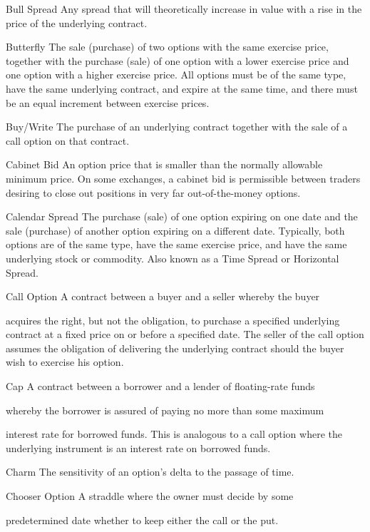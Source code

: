 Bull Spread Any spread that will theoretically increase in value with a rise in the price of the underlying contract.\par
Butterfly The sale (purchase) of two options with the same exercise price, together with the purchase (sale) of one option with a lower exercise price and one option with a higher exercise price. All options must be of the same type, have the same underlying contract, and expire at the same time, and there must be an equal increment between exercise prices.\par
Buy/Write The purchase of an underlying contract together with the sale of a call option on that contract.\par
Cabinet Bid An option price that is smaller than the normally allowable minimum price. On some exchanges, a cabinet bid is permissible between traders desiring to close out positions in very far out-of-the-money options.\par
Calendar Spread The purchase (sale) of one option expiring on one date and the sale (purchase) of another option expiring on a different date. Typically, both options are of the same type, have the same exercise price, and have the same underlying stock or commodity. Also known as a Time Spread or Horizontal Spread.\par
Call Option A contract between a buyer and a seller whereby the buyer\par
acquires the right, but not the obligation, to purchase a specified underlying contract at a fixed price on or before a specified date. The seller of the call option assumes the obligation of delivering the underlying contract should the buyer wish to exercise his option.\par
Cap A contract between a borrower and a lender of floating-rate funds\par
whereby the borrower is assured of paying no more than some maximum\par
interest rate for borrowed funds. This is analogous to a call option where the underlying instrument is an interest rate on borrowed funds.\par
Charm The sensitivity of an option's delta to the passage of time.\par
Chooser Option A straddle where  the owner must decide by some\par
predetermined date whether to keep either the call or the put.\par

